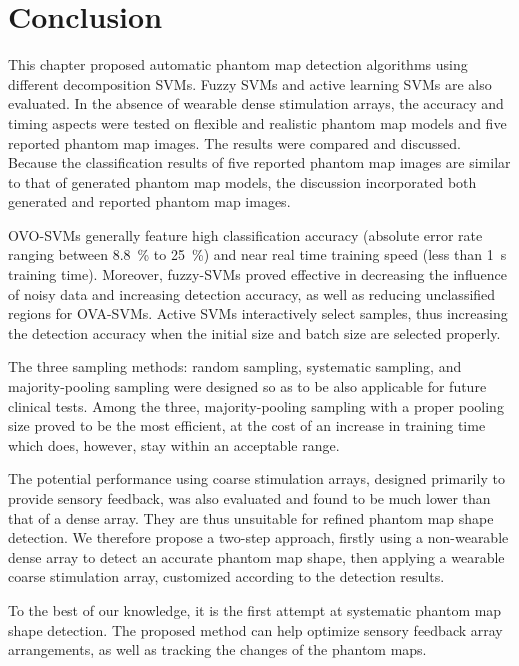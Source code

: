 \section{Conclusion}
\label{chap2:sec:summary}
This chapter proposed automatic phantom map detection algorithms using different decomposition SVMs. Fuzzy SVMs and active learning SVMs are also evaluated. 
In the absence of wearable dense stimulation arrays, the accuracy and timing aspects were tested on flexible and realistic phantom map models and five reported phantom map images. The results were compared and discussed. Because the classification results of five reported phantom map images are similar to that of generated phantom map models, the discussion incorporated both generated and reported phantom map images.

OVO-SVMs generally feature high classification accuracy (absolute error rate ranging between \SI{8.8}{\%} to \SI{25}{\%}) and near real time training speed (less than \SI{1}{s} training time). 
Moreover, fuzzy-SVMs proved effective in decreasing the influence of noisy data and increasing detection accuracy, as well as reducing unclassified regions for OVA-SVMs. Active SVMs interactively select samples, thus increasing the detection accuracy when the initial size and batch size are selected properly. 

The three sampling methods: random sampling, systematic sampling, and majority-pooling sampling were designed so as to be also applicable for future clinical tests.
Among the three, majority-pooling sampling with a proper pooling size proved to be the most efficient, at the cost of an increase in training time which does, however, stay within an acceptable range.

The potential performance using coarse stimulation arrays, designed primarily to provide sensory feedback, was also evaluated and found to be much lower than that of a dense array. They are thus unsuitable for refined phantom map shape detection. We therefore propose a two-step approach, firstly using a non-wearable dense array to detect an accurate phantom map shape, then applying a wearable coarse stimulation array, customized according to the detection results.


To the best of our knowledge, it is the first attempt at systematic phantom map shape detection. The proposed method can help optimize sensory feedback array arrangements, as well as tracking the changes of the phantom maps.

